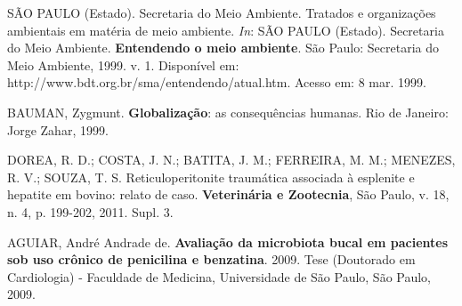 \documentclass[
        oneside,      %
        english,			
        brazil			 
        ]{abntbibufjf}
\begin{document}
\begin{thebibliography}{99}




 S\~AO PAULO (Estado). Secretaria do Meio Ambiente. Tratados e organiza\c{c}\~oes ambientais em mat\'eria de meio ambiente. \textit{In}: S\~AO
PAULO (Estado). Secretaria do Meio Ambiente. \textbf{Entendendo o meio ambiente}. S\~ao Paulo: Secretaria do Meio Ambiente, 1999. v. 1. Disponível em: 
http://www.bdt.org.br/sma/entendendo/atual.htm. Acesso em: 8 mar. 1999.


 BAUMAN, Zygmunt. \textbf{Globaliza\c{c}\~ao}: as consequ\^encias humanas. Rio de Janeiro: Jorge Zahar, 1999.


 DOREA, R. D.; COSTA, J. N.; BATITA, J. M.; FERREIRA, M. M.; MENEZES, R. V.; SOUZA, T. S. Reticuloperitonite traum\'atica associada \`a esplenite 
e hepatite em bovino: relato de caso. \textbf{Veterin\'aria e Zootecnia}, S\~ao Paulo, v. 18, n. 4, p. 199-202, 2011. Supl. 3.


 AGUIAR, Andr\'e Andrade de. \textbf{Avalia\c{c}\~ao da microbiota bucal em pacientes sob uso cr\^onico de penicilina e benzatina}. 2009. 
Tese (Doutorado em Cardiologia) - Faculdade de Medicina, Universidade de S\~ao Paulo, S\~ao Paulo, 2009.





\end{thebibliography}
\end{document}
